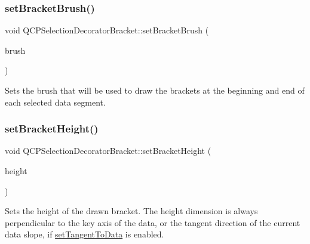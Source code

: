 \mbox{\label{class_q_c_p_selection_decorator_bracket_a2f4ea0bfb0ea980252b76dd349dd53aa}} 
\subsubsection{\texorpdfstring{set\+Bracket\+Brush()}{setBracketBrush()}}
{\footnotesize\ttfamily void Q\+C\+P\+Selection\+Decorator\+Bracket\+::set\+Bracket\+Brush (\begin{DoxyParamCaption}\item[{const Q\+Brush \&}]{brush }\end{DoxyParamCaption})}

Sets the brush that will be used to draw the brackets at the beginning and end of each selected data segment. \mbox{\label{class_q_c_p_selection_decorator_bracket_aed773ad737201cca40efc6fe451acad8}} 
\subsubsection{\texorpdfstring{set\+Bracket\+Height()}{setBracketHeight()}}
{\footnotesize\ttfamily void Q\+C\+P\+Selection\+Decorator\+Bracket\+::set\+Bracket\+Height (\begin{DoxyParamCaption}\item[{int}]{height }\end{DoxyParamCaption})}

Sets the height of the drawn bracket. The height dimension is always perpendicular to the key axis of the data, or the tangent direction of the current data slope, if \hyperlink{class_q_c_p_selection_decorator_bracket_a93bc6086e53a5e40a08641a7b2e2cdd5}{set\+Tangent\+To\+Data} is enabled. \mbox{\label{class_q_c_p_selection_decorator_bracket_ac0e392a6097990f8aa978932a8fa05d6}} 
